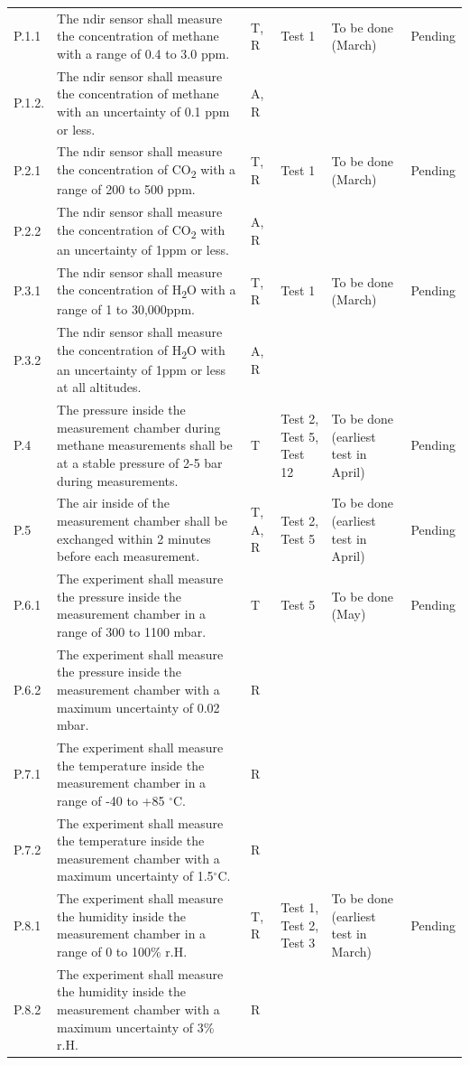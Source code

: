 \documentclass[12pt,a4paper]{report}
\newcommand{\degree}{\ensuremath{^\circ}}
\begin{document}
\begin{longtable}{L{0.7cm}L{5cm}L{1.5cm}L{2cm}L{2.5cm}L{2cm}}
P.1.1 & The \ac{ndir} sensor shall measure the concentration of methane with a range of 0.4 to 3.0 ppm. & T, R & Test 1 & To be done (March) & Pending \\
P.1.2. & The \ac{ndir} sensor shall measure the concentration of methane with an uncertainty of 0.1 ppm or less. & A, R & & & \\
P.2.1 & The \ac{ndir} sensor shall measure the concentration of CO\textsubscript{2} with a range of 200 to 500 ppm. & T, R & Test 1 & To be done (March) & Pending \\
P.2.2 & The \ac{ndir} sensor shall measure the concentration of CO\textsubscript{2} with an uncertainty of 1ppm or less. & A, R & & & \\
P.3.1 & The \ac{ndir} sensor shall measure the concentration of H\textsubscript{2}O with a range of 1 to 30,000ppm. & T, R & Test 1 & To be done (March) & Pending \\
P.3.2 & The \ac{ndir} sensor shall measure the concentration of H\textsubscript{2}O with an uncertainty of 1ppm or less at all altitudes. & A, R & & & \\
P.4 & The pressure inside the measurement chamber during methane measurements shall be at a stable pressure of 2-5 bar during measurements. & T & Test 2, Test 5, Test 12 & To be done (earliest test in April) & Pending \\
P.5 & The air inside of the measurement chamber shall be exchanged within 2 minutes before each measurement. & T, A, R & Test 2, Test 5 & To be done (earliest test in April) & Pending \\
P.6.1 & The experiment shall measure the pressure inside the measurement chamber in a range of 300 to 1100 mbar. & T & Test 5 & To be done (May) & Pending \\
P.6.2 & The experiment shall measure the pressure inside the measurement chamber with a maximum uncertainty of 0.02 mbar. & R & & & \\
P.7.1 & The experiment shall measure the temperature inside the measurement chamber in a range of -40 to +85 \degree C. & R & & & \\
P.7.2 & The experiment shall measure the temperature inside the measurement chamber with a maximum uncertainty of 1.5\degree C. & R & & & \\
P.8.1 & The experiment shall measure the humidity inside the measurement chamber in a range of 0 to 100\% r.H. & T, R & Test 1, Test 2, Test 3 & To be done (earliest test in March) & Pending \\
P.8.2 & The experiment shall measure the humidity inside the measurement chamber with a maximum uncertainty of 3\% r.H. & R & & & \\

\end{longtable}
\end{document}
